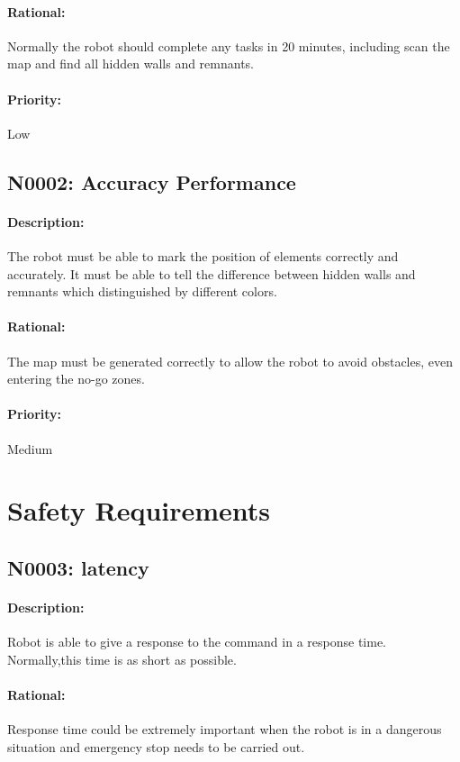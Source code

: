 \documentclass[11pt, a4paper]{report}
\begin{document}
\paragraph{Rational:}
Normally the robot should complete any tasks in 20 minutes, including scan the map and find all hidden walls and remnants.
\paragraph{Priority:}
Low

\subsection{N0002: Accuracy Performance}
\paragraph{Description:}
The robot must be able to mark the position of elements correctly and accurately. It must be able to tell the difference between hidden walls and remnants which distinguished by different colors.
\paragraph{Rational:}
The map must be generated correctly to allow the robot to avoid obstacles, even entering the no-go zones.
\paragraph{Priority:}
Medium

\section{Safety Requirements}

\subsection{N0003: latency}
\paragraph{Description:}
Robot is able to give a response to the command in a response time. Normally,this time is as short as possible.
\paragraph{Rational:}
Response time could be extremely important when the robot is in a dangerous situation and emergency stop needs to be carried out.
\end{document}
